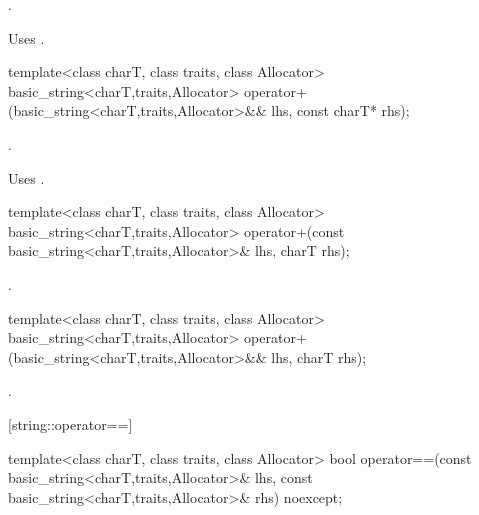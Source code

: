 \begin{itemdescr}
\pnum
\returns
{}.

\pnum
\notes
Uses
.
\end{itemdescr}

%
%
\begin{itemdecl}
template<class charT, class traits, class Allocator>
  basic_string<charT,traits,Allocator>
    operator+(basic_string<charT,traits,Allocator>&& lhs,
              const charT* rhs);
\end{itemdecl}

\begin{itemdescr}
\pnum
\returns
{}.

\pnum
\notes
Uses
.
\end{itemdescr}

%
%
\begin{itemdecl}
template<class charT, class traits, class Allocator>
  basic_string<charT,traits,Allocator>
    operator+(const basic_string<charT,traits,Allocator>& lhs,
              charT rhs);
\end{itemdecl}

\begin{itemdescr}
\pnum
\returns
{}.
\end{itemdescr}

%
%
\begin{itemdecl}
template<class charT, class traits, class Allocator>
  basic_string<charT,traits,Allocator>
    operator+(basic_string<charT,traits,Allocator>&& lhs,
              charT rhs);
\end{itemdecl}

\begin{itemdescr}
\pnum
\returns
{}.
\end{itemdescr}

[string::operator==]{}

%
%
\begin{itemdecl}
template<class charT, class traits, class Allocator>
  bool operator==(const basic_string<charT,traits,Allocator>& lhs,
                  const basic_string<charT,traits,Allocator>& rhs) noexcept;
\end{itemdecl}

